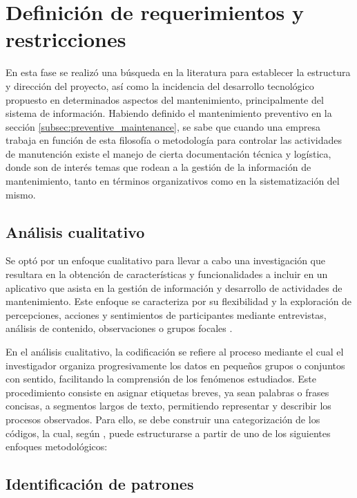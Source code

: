 \section{Definición de requerimientos y restricciones}

    En esta fase se realizó una búsqueda en la literatura para establecer la estructura y dirección del proyecto, así como la incidencia del desarrollo tecnológico propuesto en determinados aspectos del mantenimiento, principalmente del sistema de información. Habiendo definido el mantenimiento preventivo en la sección \ref{subsec:preventive_maintenance}, se sabe que cuando una empresa trabaja en función de esta filosofía o metodología para controlar las actividades de manutención existe el manejo de cierta documentación técnica y logística, donde son de interés temas que rodean a la gestión de la información de mantenimiento, tanto en términos organizativos como en la sistematización del mismo.

    \subsection{Análisis cualitativo}

        Se optó por un enfoque cualitativo para llevar a cabo una investigación que resultara en la obtención de características y funcionalidades a incluir en un aplicativo que asista en la gestión de  información y desarrollo de actividades de mantenimiento. Este enfoque se caracteriza por su flexibilidad y la exploración de percepciones, acciones y sentimientos de participantes mediante entrevistas, análisis de contenido, observaciones o grupos focales \parencite{BARROGA:2023}.

        En el análisis cualitativo, la codificación se refiere al proceso mediante el cual el investigador organiza progresivamente los datos en pequeños grupos o conjuntos con sentido, facilitando la comprensión de los fenómenos estudiados. Este procedimiento consiste en asignar etiquetas breves, ya sean palabras o frases concisas, a segmentos largos de texto, permitiendo representar y describir los procesos observados. Para ello, se debe construir una categorización de los códigos, la cual, según \textcite{RODRIGUEZ:2005}, puede estructurarse a partir de uno de los siguientes enfoques metodológicos:

    \subsection{Identificación de patrones}

